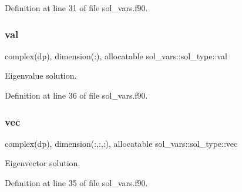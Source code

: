 Definition at line 31 of file sol\+\_\+vars.\+f90.

\mbox{\label{structsol__vars_1_1sol__type_a4cb91aeea05a69a04dceef7951be1004}} 
\subsubsection{\texorpdfstring{val}{val}}
{\footnotesize\ttfamily complex(dp), dimension(\+:), allocatable sol\+\_\+vars\+::sol\+\_\+type\+::val}



Eigenvalue solution. 



Definition at line 36 of file sol\+\_\+vars.\+f90.

\mbox{\label{structsol__vars_1_1sol__type_a5e21f3c7b6581901982958615c3f936e}} 
\subsubsection{\texorpdfstring{vec}{vec}}
{\footnotesize\ttfamily complex(dp), dimension(\+:,\+:,\+:), allocatable sol\+\_\+vars\+::sol\+\_\+type\+::vec}



Eigenvector solution. 



Definition at line 35 of file sol\+\_\+vars.\+f90.




